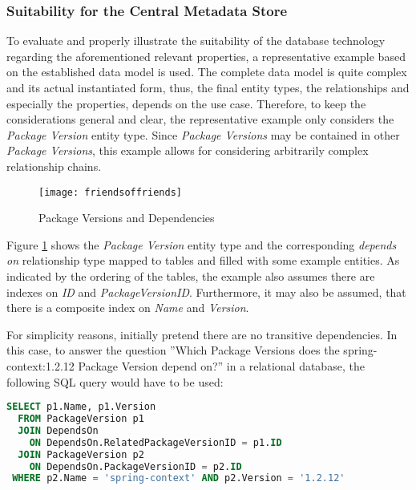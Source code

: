 \subsubsection{Suitability for the Central Metadata Store}
To evaluate and properly illustrate the suitability of the database technology regarding the aforementioned relevant properties, a representative example based on the established data model is used. The complete data model is quite complex and its actual instantiated form, thus, the final entity types, the relationships and especially the properties, depends on the use case. Therefore, to keep the considerations general and clear, the representative example only considers the \emph{Package Version} entity type. Since \emph{Package Versions} may be contained in other \emph{Package Versions}, this example allows for considering arbitrarily complex relationship chains.\par

\begin{figure}[H]
	\centering
	\texttt{[image: friendsoffriends]}
	\caption[Package Versions and Dependencies as Table]{Package Versions and Dependencies }
	\label{fig:PackageVersionsAndDependencies}
\end{figure}

Figure \ref{fig:PackageVersionsAndDependencies} shows the \emph{Package Version} entity type and the corresponding \emph{depends on} relationship type mapped to tables and filled with some example entities.  As indicated by the ordering of the tables, the example also assumes there are indexes on \emph{ID} and \emph{PackageVersionID}. Furthermore, it may also be assumed, that there is a composite index on \emph{Name} and \emph{Version}.\par
For simplicity reasons, initially pretend there are no transitive dependencies. In this case, to answer the question ''Which Package Versions does the spring-context:1.2.12 Package Version depend on?'' in a relational database, the following SQL query would have to be used:\\

\begin{lstlisting}[language=SQL, caption=SQL Query -- Package Version Dependencies, captionpos=b, label=lst:PackageVersionDependencies]
SELECT p1.Name, p1.Version
  FROM PackageVersion p1 
  JOIN DependsOn
    ON DependsOn.RelatedPackageVersionID = p1.ID
  JOIN PackageVersion p2
    ON DependsOn.PackageVersionID = p2.ID
 WHERE p2.Name = 'spring-context' AND p2.Version = '1.2.12'
\end{lstlisting}

